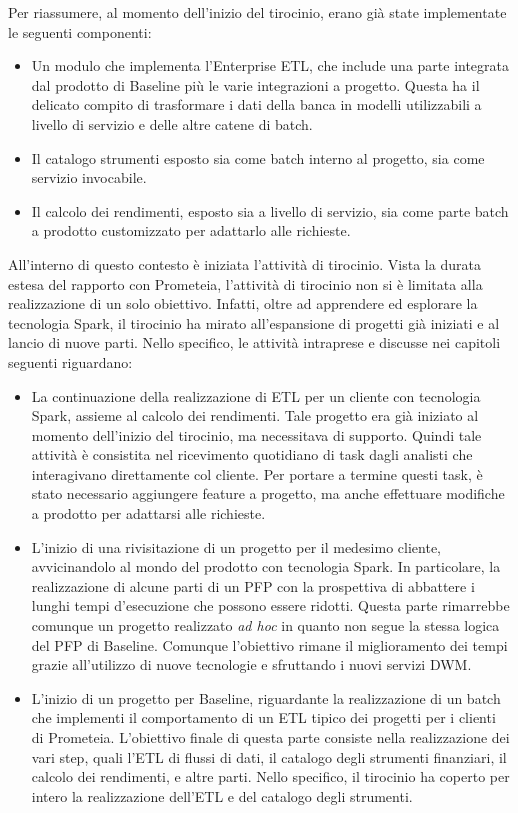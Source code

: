 Per riassumere, al momento dell'inizio del tirocinio, erano già state implementate le seguenti componenti:
\begin{itemize}
    \item Un modulo che implementa l'Enterprise ETL, che include una parte integrata dal prodotto di Baseline più le varie integrazioni a progetto.
    Questa ha il delicato compito di trasformare i dati della banca in modelli utilizzabili a livello di servizio e delle altre catene di batch.
    \item Il catalogo strumenti esposto sia come batch interno al progetto, sia come servizio invocabile.
    \item Il calcolo dei rendimenti, esposto sia a livello di servizio, sia come parte batch a prodotto customizzato per adattarlo alle richieste.
\end{itemize}

All'interno di questo contesto è iniziata l'attività di tirocinio.
Vista la durata estesa del rapporto con Prometeia, l'attività di tirocinio non si è limitata alla realizzazione di un solo obiettivo.
Infatti, oltre ad apprendere ed esplorare la tecnologia Spark, il tirocinio ha mirato all'espansione di progetti già iniziati e al lancio di nuove parti.
Nello specifico, le attività intraprese e discusse nei capitoli seguenti riguardano:
\begin{itemize}
    \item La continuazione della realizzazione di ETL per un cliente con tecnologia Spark, assieme al calcolo dei rendimenti.
    Tale progetto era già iniziato al momento dell'inizio del tirocinio, ma necessitava di supporto.
    Quindi tale attività è consistita nel ricevimento quotidiano di task dagli analisti che interagivano direttamente col cliente.
    Per portare a termine questi task, è stato necessario aggiungere feature a progetto, ma anche effettuare modifiche a prodotto per adattarsi alle richieste.
    \item L'inizio di una rivisitazione di un progetto per il medesimo cliente, avvicinandolo al mondo del prodotto con tecnologia Spark.
    In particolare, la realizzazione di alcune parti di un PFP con la prospettiva di abbattere i lunghi tempi d'esecuzione che possono essere ridotti.
    Questa parte rimarrebbe comunque un progetto realizzato \textit{ad hoc} in quanto non segue la stessa logica del PFP di Baseline.
    Comunque l'obiettivo rimane il miglioramento dei tempi grazie all'utilizzo di nuove tecnologie e sfruttando i nuovi servizi DWM.
    \item L'inizio di un progetto per Baseline, riguardante la realizzazione di un batch che implementi il comportamento di un ETL tipico dei progetti per i clienti di Prometeia.
    L'obiettivo finale di questa parte consiste nella realizzazione dei vari step, quali l'ETL di flussi di dati, il catalogo degli strumenti finanziari, il calcolo dei rendimenti, e altre parti.
    Nello specifico, il tirocinio ha coperto per intero la realizzazione dell'ETL e del catalogo degli strumenti.
\end{itemize}

